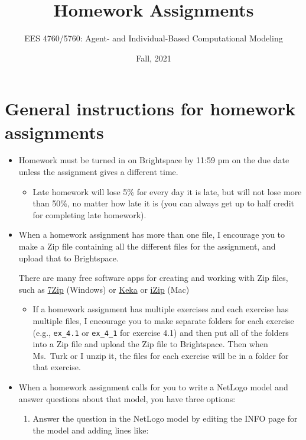 \documentclass[
]{article}
\title{Homework Assignments}
\author{EES 4760/5760: Agent- and Individual-Based Computational
Modeling}
\date{Fall, 2021}
\providecommand{\tightlist}{%
  \setlength{\itemsep}{0pt}\setlength{\parskip}{0pt}}
\begin{document}
\maketitle

\hypertarget{general-instructions-for-homework-assignments}{%
\section{General instructions for homework
assignments}\label{general-instructions-for-homework-assignments}}

\begin{itemize}
\item
  Homework must be turned in on Brightspace by 11:59 pm on the due date
  unless the assignment gives a different time.

  \begin{itemize}
  \tightlist
  \item
    Late homework will lose 5\% for every day it is late, but will not
    lose more than 50\%, no matter how late it is (you can always get up
    to half credit for completing late homework).
  \end{itemize}
\item
  When a homework assignment has more than one file, I encourage you to
  make a Zip file containing all the different files for the assignment,
  and upload that to Brightspace.

  There are many free software apps for creating and working with Zip
  files, such as \href{https://www.7-zip.org/}{7Zip} (Windows) or
  \href{https://www.keka.io/en/}{Keka} or
  \href{https://www.izip.com/}{iZip} (Mac)

  \begin{itemize}
  \tightlist
  \item
    If a homework assignment has multiple exercises and each exercise
    has multiple files, I encourage you to make separate folders for
    each exercise (e.g., \texttt{ex\_4.1} or \texttt{ex\_4\_1} for
    exercise 4.1) and then put all of the folders into a Zip file and
    upload the Zip file to Brightspace. Then when Ms.~Turk or I unzip
    it, the files for each exercise will be in a folder for that
    exercise.
  \end{itemize}
\item
  When a homework assignment calls for you to write a NetLogo model and
  answer questions about that model, you have three options:

  \begin{enumerate}
  \def\labelenumi{\arabic{enumi}.}
  \item
    Answer the question in the NetLogo model by editing the INFO page
    for the model and adding lines like:


\end{enumerate}
\end{itemize}
\end{document}

